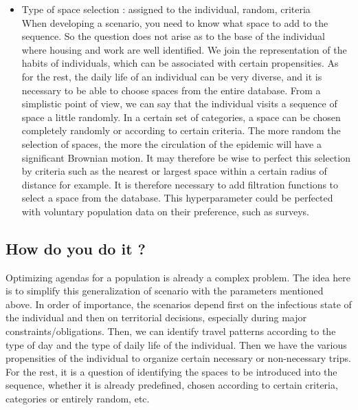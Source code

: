 \begin{itemize}
\item Type of space selection : assigned to the individual, random, criteria\\
When developing a scenario, you need to know what space to add to the sequence. So the question does not arise as to the base of the individual where housing and work are well identified. We join the representation of the habits of individuals, which can be associated with certain propensities. As for the rest, the daily life of an individual can be very diverse, and it is necessary to be able to choose spaces from the entire database. From a simplistic point of view, we can say that the individual visits a sequence of space a little randomly. In a certain set of categories, a space can be chosen completely randomly or according to certain criteria. The more random the selection of spaces, the more the circulation of the epidemic will have a significant Brownian motion. It may therefore be wise to perfect this selection by criteria such as the nearest or largest space within a certain radius of distance for example. It is therefore necessary to add filtration functions to select a space from the database. This hyperparameter could be perfected with voluntary population data on their preference, such as surveys.\\

\end{itemize}

\subsection{How do you do it ?}

Optimizing agendas for a population is already a complex problem. The idea here is to simplify this generalization of scenario with the parameters mentioned above. In order of importance, the scenarios depend first on the infectious state of the individual and then on territorial decisions, especially during major constraints/obligations. Then, we can identify travel patterns according to the type of day and the type of daily life of the individual. Then we have the various propensities of the individual to organize certain necessary or non-necessary trips. For the rest, it is a question of identifying the spaces to be introduced into the sequence, whether it is already predefined, chosen according to certain criteria, categories or entirely random, etc.\\

